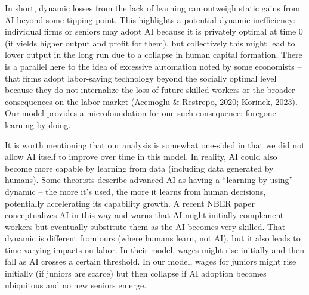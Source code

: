 \documentclass[12pt]{article}
\begin{document}
In short, {dynamic losses from the lack of learning can outweigh
static gains from AI} beyond some tipping point. This highlights a
potential {dynamic inefficiency}: individual firms or seniors may
adopt AI because it is privately optimal at time 0 (it yields higher
output and profit for them), but collectively this might lead to lower
output in the long run due to a collapse in human capital formation.
There is a parallel here to the idea of {excessive automation}
noted by some economists -- that firms adopt labor-saving technology
beyond the socially optimal level because they do not internalize the
loss of future skilled workers or the broader consequences on the labor
market (Acemoglu \& Restrepo, 2020; Korinek, 2023). Our model provides a
microfoundation for one such consequence: {foregone
learning-by-doing}.

It is worth mentioning that our analysis is somewhat one-sided in that
{we did not allow AI itself to improve} over time in this model.
In reality, AI could also become more capable by learning from data
(including data generated by humans). Some theorists describe advanced
AI as having a ``learning-by-using'' dynamic -- the more it's used, the
more it learns from human decisions, potentially {accelerating} its
capability growth. A recent NBER paper conceptualizes AI in this way and
warns that AI might initially complement workers but eventually
substitute them as the AI becomes very skilled. That dynamic is
different from ours (where humans learn, not AI), but it also leads to
time-varying impacts on labor. In their model, wages might rise
initially and then fall as AI crosses a certain threshold. In our model,
wages for juniors might rise initially (if juniors are scarce) but then
collapse if AI adoption becomes ubiquitous and no new seniors emerge.
\end{document}
